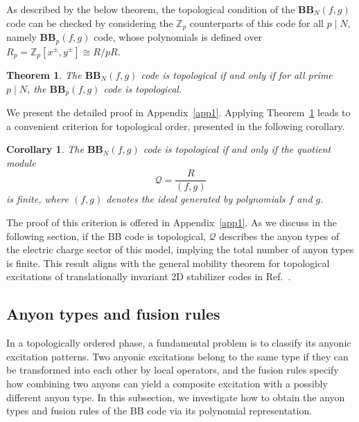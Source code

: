 \documentclass[aps,prb,english,superscriptaddress,twocolumn,tightenlines,showpacs,longbibliography,floatfix,amsfonts]{revtex4-2}
\newtheorem{thm}{Theorem}
\newtheorem{cor}{Corollary}
\begin{document}
As described by the below theorem, the topological condition of the $\mathbf{BB}_{N}(f,g)$ code can be checked by considering the $\mathbb{Z}_p$ counterparts of this code for all $p\mid N$, namely $\mathbf{BB}_{p}(f,g)$ code, whose polynomials is defined over $R_p=\mathbb{Z}_p[x^{\pm},y^{\pm}]\cong R/pR$.
\begin{thm}
    The $\mathbf{BB}_N(f,g)$ code is topological if and only if for all prime $p\mid N$, the $\mathbf{BB}_p(f,g)$ code is topological.\label{lem:topo_prime_factors}
\end{thm}
We present the detailed proof in Appendix~\ref{app1}. Applying Theorem~\ref{lem:topo_prime_factors} leads to a convenient criterion for topological order, presented in the following corollary.
\begin{cor}
    The $\mathbf{BB}_N(f,g)$ code is topological if and only if the quotient module
    \begin{equation}
        \mathcal{Q}=\frac{R}{(f,g)}
    \end{equation}
    is finite, where $(f,g)$ denotes the ideal generated by polynomials $f$ and $g$.\label{cor:topo_finite}
\end{cor}
The proof of this criterion is offered in Appendix~\ref{app1}. As we discuss in the following section, if the BB code is topological, $\mathcal{Q}$ describes the anyon types of the electric charge sector of this model, implying the total number of anyon types is finite. This result aligns with the general mobility theorem for topological excitations of translationally invariant 2D stabilizer codes in Ref.~\cite{Ruba2024}.
\subsection{Anyon types and fusion rules \label{sec4b}}
In a topologically ordered phase, a fundamental problem is to classify its anyonic excitation patterns. Two anyonic excitations belong to the same type if they can be transformed into each other by local operators, and the fusion rules specify how combining two anyons can yield a composite excitation with a possibly different anyon type. In this subsection, we investigate how to obtain the anyon types and fusion rules of the BB code via its polynomial representation.
  
\end{document}
